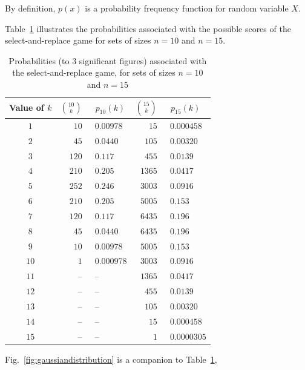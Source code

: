By definition, $p(x)$ is a probability frequency function for random variable $X$.

\medskip

Table~\ref{tab:select-replace} illustrates the probabilities associated with the 
possible scores of the {\sc select-and-replace} game for sets of sizes $n = 10$
and $n= 15$.  
\begin{table}[htb]
\label{tab:select-replace}
\caption{Probabilities (to $3$ significant figures) associated with the 
{\sc select-and-replace} game, for sets of sizes $n = 10$ and $n= 15$}
\begin{center}
\begin{tabular}{|c||r|l||r|l|}
\hline
Value of $k$ & $\displaystyle {10 \choose k}$ & \ $p_{10}(k)$ 
& $\displaystyle {15 \choose k}$ & \ $p_{15}(k)$ \\
\hline
\hline
$1$   &   $10$ & \ $0.00978$ &     $15$ &  \ $0.000458$ \\
$2$   &   $45$ & \ $0.0440$   &   $105$ &  \ $0.00320$ \\
$3$   & $120$ & \ $0.117$     &   $455$ &  \ $0.0139$ \\
$4$   & $210$ & \ $0.205$    & $1365$ &  \ $0.0417$ \\
$5$   & $252$ & \ $0.246$    & $3003$ &  \ $0.0916$ \\
$6$   & $210$ & \ $0.205$    & $5005$ &  \ $0.153$ \\
$7$   & $120$ & \ $0.117$    & $6435$ &  \ $0.196$ \\
$8$   &   $45$ & \ $0.0440$  & $6435$ &  \ $0.196$ \\
$9$   &   $10$ & \ $0.00978$ & $5005$  & \ $0.153$ \\
$10$ &     $1$ & \ $0.000978$ & $3003$  & \ $0.0916$ \\
$11$ & --        & \ --                 & $1365$  & \ $0.0417$ \\
$12$ & --        & \ --            &    $455$ & \ $0.0139$ \\
$13$ & --       & \ --             &    $105$ & \ $0.00320$ \\
$14$ & --       & \ --             &      $15$ & \ $0.000458$ \\
$15$ & --       & \ --             &        $1$ & \ $0.0000305$  \\
\hline
\end{tabular}
\end{center}
\end{table}
Fig.~\ref{fig:gaussiandistribution} is a companion to Table~\ref{tab:select-replace},
